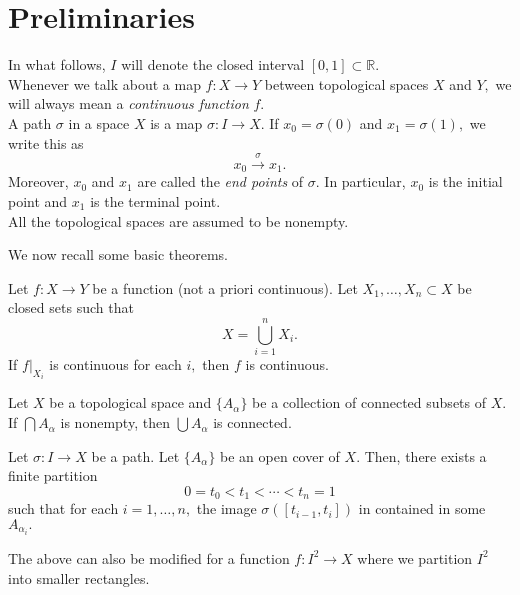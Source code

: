 \documentclass[12pt]{article}
\begin{document}
\coverpage

\updated{\today}

\thispagestyle{empty}
\tableofcontents
\newpage
\pagestyle{fancy}
\setcounter{section}{-1}
\setcounter{page}{1}


\section{Preliminaries}
In what follows, $I$ will denote the closed interval $[0, 1] \subset \mathbb{R}.$\\
Whenever we talk about a map $f:X\to Y$ between topological spaces $X$ and $Y,$ we will always mean a \emph{continuous function} $f.$\\
A path $\sigma$ in a space $X$ is a map $\sigma: I \to X.$ If $x_0 = \sigma(0)$ and $x_1 = \sigma(1),$ we write this as
\begin{equation*} 
	x_0 \overset{\sigma}{\longrightarrow} x_1.
\end{equation*}
Moreover, $x_0$ and $x_1$ are called the \emph{end points} of $\sigma.$ In particular, $x_0$ is the initial point and $x_1$ is the terminal point.\\
All the topological spaces are assumed to be nonempty.

We now recall some basic theorems.

\begin{thm} \label{thm:pastinglemma}
	Let $f:X\to Y$ be a function (not a priori continuous). Let $X_1, \ldots, X_n \subset X$ be closed sets such that
	\begin{equation*} 
		X = \bigcup_{i = 1}^n X_i.
	\end{equation*}
	If $f|_{X_i}$ is continuous for each $i,$ then $f$ is continuous.
\end{thm}

\begin{thm}
	Let $X$ be a topological space and $\{A_\alpha\}$ be a collection of connected subsets of $X.$ If $\bigcap A_\alpha$ is nonempty, then $\bigcup A_\alpha$ is connected.
\end{thm}

\begin{thm} \label{thm:lebesgue}
	Let $\sigma:I\to X$ be a path. Let $\{A_\alpha\}$ be an open cover of $X.$ Then, there exists a finite partition
	\begin{equation*} 
		0 = t_0 < t_1 < \cdots < t_n = 1
	\end{equation*}
	such that for each $i = 1, \ldots, n,$ the image $\sigma([t_{i - 1}, t_i])$ in contained in some $A_{\alpha_i}.$
\end{thm}
The above can also be modified for a function $f:I^2 \to X$ where we partition $I^2$ into smaller rectangles.
\end{document}
